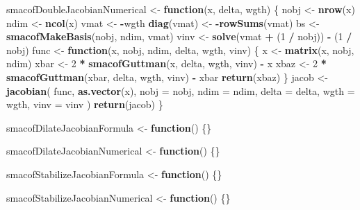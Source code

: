 \documentclass[
  12pt,
]{article}
\newenvironment{Shaded}{\begin{snugshade}}{\end{snugshade}}
\newcommand{\AttributeTok}[1]{\textcolor[rgb]{0.13,0.29,0.53}{#1}}
\newcommand{\ControlFlowTok}[1]{\textcolor[rgb]{0.13,0.29,0.53}{\textbf{#1}}}
\newcommand{\DecValTok}[1]{\textcolor[rgb]{0.00,0.00,0.81}{#1}}
\newcommand{\FunctionTok}[1]{\textcolor[rgb]{0.13,0.29,0.53}{\textbf{#1}}}
\newcommand{\NormalTok}[1]{#1}
\newcommand{\OtherTok}[1]{\textcolor[rgb]{0.56,0.35,0.01}{#1}}
\newcommand{\SpecialCharTok}[1]{\textcolor[rgb]{0.81,0.36,0.00}{\textbf{#1}}}
\begin{document}
\begin{Shaded}
\begin{Highlighting}[]
\NormalTok{smacofDoubleJacobianNumerical }\OtherTok{\textless{}{-}} \ControlFlowTok{function}\NormalTok{(x, delta, wgth) \{}
\NormalTok{  nobj }\OtherTok{\textless{}{-}} \FunctionTok{nrow}\NormalTok{(x)}
\NormalTok{  ndim }\OtherTok{\textless{}{-}} \FunctionTok{ncol}\NormalTok{(x)}
\NormalTok{  vmat }\OtherTok{\textless{}{-}} \SpecialCharTok{{-}}\NormalTok{wgth}
  \FunctionTok{diag}\NormalTok{(vmat) }\OtherTok{\textless{}{-}} \SpecialCharTok{{-}}\FunctionTok{rowSums}\NormalTok{(vmat)}
\NormalTok{  bs }\OtherTok{\textless{}{-}} \FunctionTok{smacofMakeBasis}\NormalTok{(nobj, ndim, vmat)}
\NormalTok{  vinv }\OtherTok{\textless{}{-}} \FunctionTok{solve}\NormalTok{(vmat }\SpecialCharTok{+}\NormalTok{ (}\DecValTok{1} \SpecialCharTok{/}\NormalTok{ nobj)) }\SpecialCharTok{{-}}\NormalTok{ (}\DecValTok{1} \SpecialCharTok{/}\NormalTok{ nobj)}
\NormalTok{  func }\OtherTok{\textless{}{-}} \ControlFlowTok{function}\NormalTok{(x, nobj, ndim, delta, wgth, vinv) \{}
\NormalTok{    x }\OtherTok{\textless{}{-}} \FunctionTok{matrix}\NormalTok{(x, nobj, ndim)}
\NormalTok{    xbar }\OtherTok{\textless{}{-}} \DecValTok{2} \SpecialCharTok{*} \FunctionTok{smacofGuttman}\NormalTok{(x, delta, wgth, vinv) }\SpecialCharTok{{-}}\NormalTok{ x}
\NormalTok{    xbaz }\OtherTok{\textless{}{-}} \DecValTok{2} \SpecialCharTok{*} \FunctionTok{smacofGuttman}\NormalTok{(xbar, delta, wgth, vinv) }\SpecialCharTok{{-}}\NormalTok{ xbar}
    \FunctionTok{return}\NormalTok{(xbaz)}
\NormalTok{  \}}
\NormalTok{  jacob }\OtherTok{\textless{}{-}} \FunctionTok{jacobian}\NormalTok{(}
\NormalTok{    func,}
    \FunctionTok{as.vector}\NormalTok{(x),}
    \AttributeTok{nobj =}\NormalTok{ nobj,}
    \AttributeTok{ndim =}\NormalTok{ ndim,}
    \AttributeTok{delta =}\NormalTok{ delta,}
    \AttributeTok{wgth =}\NormalTok{ wgth,}
    \AttributeTok{vinv =}\NormalTok{ vinv}
\NormalTok{  )}
  \FunctionTok{return}\NormalTok{(jacob)}
\NormalTok{\}}

\NormalTok{smacofDilateJacobianFormula }\OtherTok{\textless{}{-}} \ControlFlowTok{function}\NormalTok{() \{\}}

\NormalTok{smacofDilateJacobianNumerical }\OtherTok{\textless{}{-}} \ControlFlowTok{function}\NormalTok{() \{\}}


\NormalTok{smacofStabilizeJacobianFormula }\OtherTok{\textless{}{-}} \ControlFlowTok{function}\NormalTok{() \{\}}

\NormalTok{smacofStabilizeJacobianNumerical }\OtherTok{\textless{}{-}} \ControlFlowTok{function}\NormalTok{() \{\}}
\end{Highlighting}
\end{Shaded}
\end{document}
